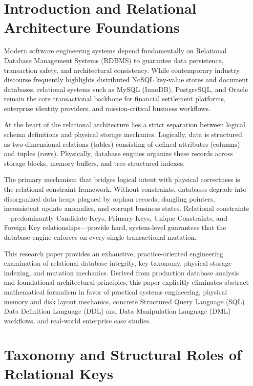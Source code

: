 \documentclass[10pt,journal,compsoc,onecolumn]{IEEEtran}
\begin{document}
\section{Introduction and Relational Architecture Foundations}
\label{sec:intro}

Modern software engineering systems depend fundamentally on Relational Database Management Systems (RDBMS) to guarantee data persistence, transaction safety, and architectural consistency. While contemporary industry discourse frequently highlights distributed NoSQL key-value stores and document databases, relational systems such as MySQL (InnoDB), PostgreSQL, and Oracle remain the core transactional backbone for financial settlement platforms, enterprise identity providers, and mission-critical business workflows.

At the heart of the relational architecture lies a strict separation between logical schema definitions and physical storage mechanics. Logically, data is structured as two-dimensional relations (tables) consisting of defined attributes (columns) and tuples (rows). Physically, database engines organize these records across storage blocks, memory buffers, and tree-structured indexes. 

The primary mechanism that bridges logical intent with physical correctness is the relational constraint framework. Without constraints, databases degrade into disorganized data heaps plagued by orphan records, dangling pointers, inconsistent update anomalies, and corrupt business states. Relational constraints---predominantly Candidate Keys, Primary Keys, Unique Constraints, and Foreign Key relationships---provide hard, system-level guarantees that the database engine enforces on every single transactional mutation.

This research paper provides an exhaustive, practice-oriented engineering examination of relational database integrity, key taxonomy, physical storage indexing, and mutation mechanics. Derived from production database analysis and foundational architectural principles, this paper explicitly eliminates abstract mathematical formalism in favor of practical systems engineering, physical memory and disk layout mechanics, concrete Structured Query Language (SQL) Data Definition Language (DDL) and Data Manipulation Language (DML) workflows, and real-world enterprise case studies.

\section{Taxonomy and Structural Roles of Relational Keys}
\label{sec:key_taxonomy}
\end{document}
